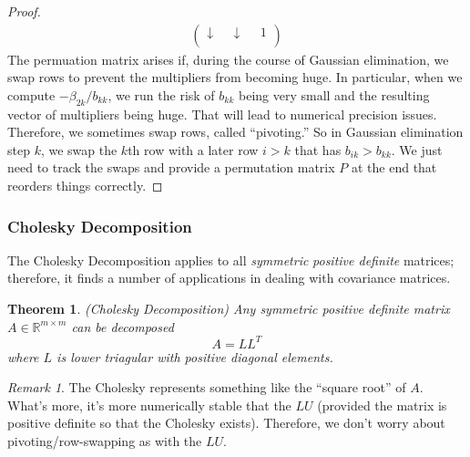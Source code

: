 \documentclass[12pt]{article}
\numberwithin{equation}{section} %
\theoremstyle{plain}
\newtheorem{thm}{Theorem}[section]
\theoremstyle{definition}
\theoremstyle{remark}
\newtheorem*{rmk}{Remark}
\newcommand{\Rmm}{\mathbb{R}^{m\times m}}
\begin{document}
\begin{proof}
\begin{align*}
\begin{pmatrix}
    \downarrow & & \downarrow & & 1 \\
  \end{pmatrix}
\end{align*}
The permuation matrix arises if, during the course of Gaussian
elimination, we swap rows to prevent the multipliers from becoming huge.
In particular, when we compute $-\beta_{2k}/b_{kk}$, we run the risk of
$b_{kk}$ being very small and the resulting vector of multipliers being
huge. That will lead to numerical precision issues. Therefore, we
sometimes swap rows, called ``pivoting.'' So in Gaussian elimination
step $k$, we swap the $k$th row with a later row $i>k$ that has
$b_{ik}>b_{kk}$. We just need to track the swaps and provide a
permutation matrix $P$ at the end that reorders things correctly.
\end{proof}


\clearpage
\subsubsection{Cholesky Decomposition}

The Cholesky Decomposition applies to all \emph{symmetric}
\emph{positive definite} matrices; therefore, it finds a number of
applications in dealing with covariance matrices.

\begin{thm}\emph{(Cholesky Decomposition)}
Any symmetric positive definite matrix $A\in\Rmm$ can be
decomposed
\begin{equation}
  A = L L^T
\end{equation}
where $L$ is lower triagular with positive diagonal elements.
\end{thm}

\begin{rmk}
The Cholesky represents something like the ``square root'' of $A$.
What's more, it's more numerically stable that the $LU$ (provided the
matrix is positive definite so that the Cholesky exists). Therefore, we
don't worry about pivoting/row-swapping as with the $LU$.
\end{rmk}
\end{document}
